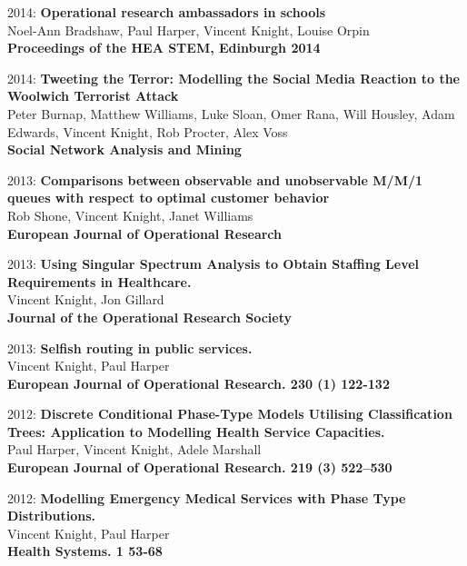 \documentclass[10pt]{res} %
\begin{document}
\begin{resume}
\begin{etaremune}
\item
2014: \textbf{Operational research ambassadors in schools}\\
Noel-Ann Bradshaw, Paul Harper, Vincent Knight, Louise Orpin
\\
\textbf{Proceedings of the HEA STEM, Edinburgh 2014}
\\

\item
2014: \textbf{Tweeting the Terror: Modelling the Social Media Reaction to the Woolwich Terrorist Attack}\\
Peter Burnap, Matthew Williams, Luke Sloan, Omer Rana, Will Housley, Adam Edwards, Vincent Knight, Rob Procter, Alex Voss
\\
\textbf{Social Network Analysis and Mining}
\\

\item
2013: \textbf{Comparisons between observable and unobservable M/M/1 queues with respect to optimal customer behavior}\\
Rob Shone, Vincent Knight, Janet Williams
\\
\textbf{European Journal of Operational Research}
\\

\item
2013: \textbf{Using Singular Spectrum Analysis to Obtain Staffing Level Requirements in Healthcare.}\\
Vincent Knight, Jon Gillard
\\
\textbf{Journal of the Operational Research Society}
\\

\item
2013: \textbf{Selfish routing in public services.}\\
Vincent Knight, Paul Harper
\\
\textbf{European Journal of Operational Research. 230 (1) 122-132}
\\

\item
2012: \textbf{Discrete Conditional Phase-Type Models Utilising Classification Trees: Application to Modelling Health Service Capacities.}\\
Paul Harper, Vincent Knight, Adele Marshall
\\
\textbf{European Journal of Operational Research. 219 (3) 522--530}
\\

\item
2012: \textbf{Modelling Emergency Medical Services with Phase Type Distributions.}\\
Vincent Knight, Paul Harper
\\
\textbf{Health Systems. 1 53-68}
\\


\end{etaremune}
\end{resume}
\end{document}

